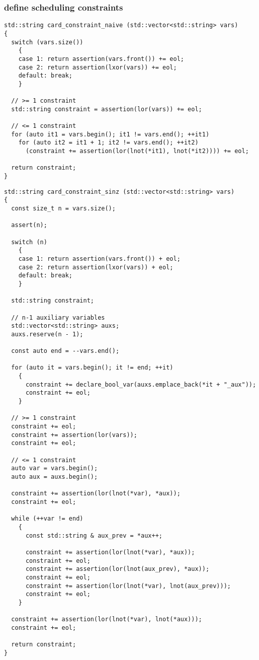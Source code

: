 \subsubsection{define scheduling constraints}

\begin{lstlisting}[style=c++]
std::string card_constraint_naive (std::vector<std::string> vars)
{
  switch (vars.size())
    {
    case 1: return assertion(vars.front()) += eol;
    case 2: return assertion(lxor(vars)) += eol;
    default: break;
    }

  // >= 1 constraint
  std::string constraint = assertion(lor(vars)) += eol;

  // <= 1 constraint
  for (auto it1 = vars.begin(); it1 != vars.end(); ++it1)
    for (auto it2 = it1 + 1; it2 != vars.end(); ++it2)
      (constraint += assertion(lor(lnot(*it1), lnot(*it2)))) += eol;

  return constraint;
}
\end{lstlisting}

\begin{lstlisting}[style=c++]
std::string card_constraint_sinz (std::vector<std::string> vars)
{
  const size_t n = vars.size();

  assert(n);

  switch (n)
    {
    case 1: return assertion(vars.front()) + eol;
    case 2: return assertion(lxor(vars)) + eol;
    default: break;
    }

  std::string constraint;

  // n-1 auxiliary variables
  std::vector<std::string> auxs;
  auxs.reserve(n - 1);

  const auto end = --vars.end();

  for (auto it = vars.begin(); it != end; ++it)
    {
      constraint += declare_bool_var(auxs.emplace_back(*it + "_aux"));
      constraint += eol;
    }

  // >= 1 constraint
  constraint += eol;
  constraint += assertion(lor(vars));
  constraint += eol;

  // <= 1 constraint
  auto var = vars.begin();
  auto aux = auxs.begin();

  constraint += assertion(lor(lnot(*var), *aux));
  constraint += eol;

  while (++var != end)
    {
      const std::string & aux_prev = *aux++;

      constraint += assertion(lor(lnot(*var), *aux));
      constraint += eol;
      constraint += assertion(lor(lnot(aux_prev), *aux));
      constraint += eol;
      constraint += assertion(lor(lnot(*var), lnot(aux_prev)));
      constraint += eol;
    }

  constraint += assertion(lor(lnot(*var), lnot(*aux)));
  constraint += eol;

  return constraint;
}
\end{lstlisting}

